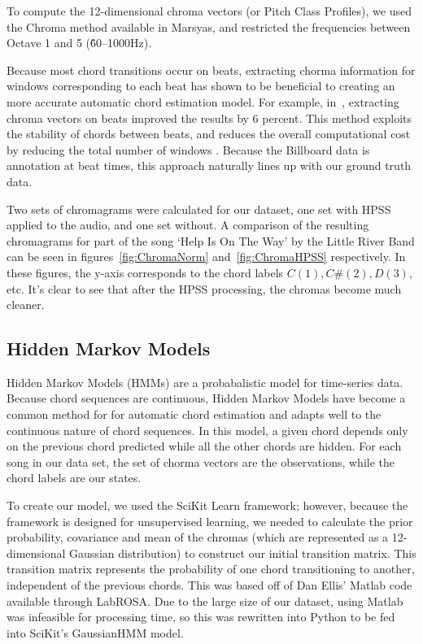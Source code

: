 \documentclass{article}
\begin{document}
To compute the 12-dimensional chroma vectors (or Pitch Class Profiles), we used
the Chroma method available in Marsyas, and restricted the frequencies between
Octave 1 and 5 (\~60--1000Hz).

Because most chord transitions occur on beats, extracting chorma information for
windows corresponding to each beat has shown to be beneficial to creating an
more accurate automatic chord estimation model. For example, in~\cite{Zenz:20},
extracting chroma vectors on beats improved the results by 6 percent. This method 
exploits the stability of chords between beats, and reduces the overall computational 
cost by reducing the total number of windows \cite{McVicor:00}. Because the Billboard 
data is annotation at beat times, this approach naturally lines up with our ground truth data.

Two sets of chromagrams were calculated for our dataset, one set with HPSS
applied to the audio, and one set without. A comparison of the resulting
chromagrams for part of the song `Help Is On The Way' by the Little River Band
can be seen in figures~\ref{fig:ChromaNorm} and~\ref{fig:ChromaHPSS}
respectively. In these figures, the y-axis corresponds to the chord labels
$ C(1), C\#(2), D(3), $ etc. It's clear to see that after the HPSS processing, the
chromas become much cleaner.

\subsection{Hidden Markov Models}

Hidden Markov Models (HMMs) are a probabalistic model for time-series data. Because chord
sequences are continuous,  Hidden Markov Models have become a common method for
for automatic chord estimation and adapts well to the continuous nature of chord sequences. 
In this model, a given chord depends only on the previous chord predicted while all the other chords 
are hidden. For each song in our data set, the set of chorma vectors are the observations,
while the chord labels are our states.

To create our model, we used the SciKit Learn framework; however, because the
framework is designed for unsupervised learning, we needed to calculate the
prior probability, covariance and mean of the chromas  (which are represented as
a 12-dimensional Gaussian distribution) to construct our initial transition
matrix.  This transition matrix represents the probability of one chord
transitioning to another, independent of the previous chords.  This was based
off of Dan Ellis' Matlab code available through LabROSA\@. Due to the large size
of our dataset, using Matlab was infeasible for processing time, so this was
rewritten into Python to be fed into SciKit's GaussianHMM model.
\end{document}
